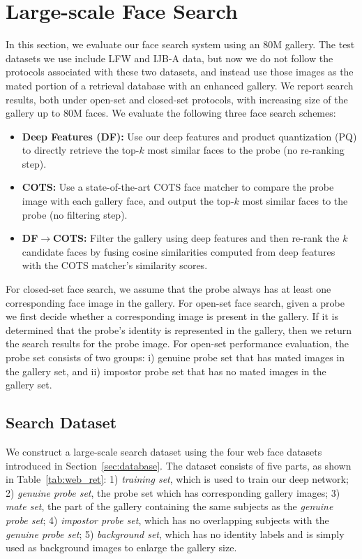 \documentclass[10pt,journal,compsoc]{IEEEtran}
\begin{document}
\section{Large-scale Face Search}
In this section, we evaluate our face search system using an $80$M gallery. The test datasets we use include LFW and IJB-A data, but now we do not follow the protocols associated with these two datasets, and instead use those images as the mated portion of a retrieval database with an enhanced gallery. We report search results, both under open-set and closed-set protocols, with increasing size of the gallery up to 80M faces. We evaluate the following three face search schemes:
\begin{itemize}
  \item {\bf Deep Features (DF):} Use our deep features and product quantization (PQ) to directly retrieve the top-$k$ most similar faces to the probe (no re-ranking step).
  \item {\bf COTS:} Use a state-of-the-art COTS face matcher to compare the probe image with each gallery face, and output the top-$k$ most similar faces to the probe (no filtering step).\item {\bf DF$\rightarrow$COTS:} Filter the gallery using deep features and then re-rank the $k$ candidate faces by fusing cosine similarities computed from deep features with the COTS matcher's similarity scores.
\end{itemize}

For closed-set face search, we assume that the probe always has at least one corresponding face image in the gallery. For open-set face search, given a probe we first decide whether a corresponding image is present in the gallery. If it is determined that the probe's identity is represented in the gallery, then we return the search results for the probe image. For open-set performance evaluation, the probe set consists of two groups: i) genuine probe set that has mated images in the gallery set, and ii) impostor probe set that has no mated images in the gallery set.

\subsection{Search Dataset}
We construct a large-scale search dataset using the four web face datasets introduced in Section~\ref{sec:database}. The dataset consists of five parts, as shown in Table~\ref{tab:web_ret}: 1) \emph{training set}, which is used to train our deep network; 2) \emph{genuine probe set}, the probe set which has corresponding gallery images; 3) \emph{mate set}, the part of the gallery containing the same subjects as the \emph{genuine probe set}; 4) \emph{impostor probe set}, which has no overlapping subjects with the \emph{genuine probe set}; 5) \emph{background set}, which has no identity labels and is simply used as background images to enlarge the gallery size.
\end{document}
